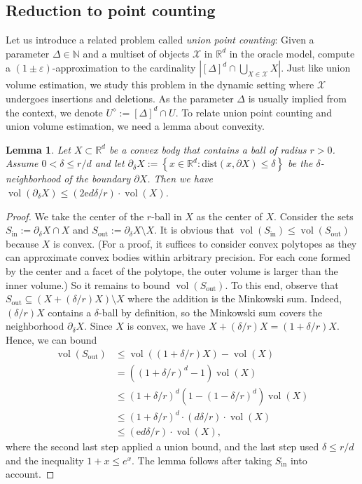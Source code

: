 \documentclass[11pt]{article}
\def\Real{\mathbb{R}}
\def\Natural{\mathbb{N}}
\let\N\Natural
\let\R\Real
\def\vol{\operatorname{vol}}		%
\def\set#1{\left\{ #1 \right\}}
\def\card#1{\left\lvert #1 \right\rvert}		%
\newtheorem{lemma}[theorem]{Lemma}
\newcommand{\eps}{\varepsilon}
\newcommand{\class}[1]{\mathcal{#1}}
\newcommand{\discrete}[1]{#1^\diamond}
\begin{document}
\subsection{Reduction to point counting}
Let us introduce a related problem called \emph{union point counting}: Given a parameter $\Delta \in \N$ and a multiset of objects $\class{X}$ in $\R^d$ in the oracle model, compute a $(1 \pm \eps)$-approximation to the cardinality $\card{[\Delta]^d \cap \bigcup_{X \in \class{X}} X}$. Just like union volume estimation, we study this problem in the dynamic setting where $\class{X}$ undergoes insertions and deletions.
%
As the parameter $\Delta$ is usually implied from the context, we denote $\discrete{U} := [\Delta]^d \cap U$. To relate union point counting and union volume estimation, we need a lemma about convexity.
%
\begin{lemma}
    \label{lem:grid}
    Let $X \subset \R^d$ be a convex body that contains a ball of radius $r > 0$. Assume $0 < \delta \leq r/d$ and let $\partial_\delta X := \set{x \in \R^d : \mathrm{dist}(x,\partial X) \leq \delta}$ be the $\delta$-neighborhood of the boundary $\partial X$. Then we have $\vol(\partial_\delta X) \leq (2 \mathrm{e} d \delta / r) \cdot \vol(X)$.
\end{lemma}
%
\begin{proof}
    We take the center of the $r$-ball in $X$ as the center of $X$. Consider the sets $S_\text{in} := \partial_\delta X \cap X$ and $S_\text{out} := \partial_\delta X \setminus X$. It is obvious that $\vol(S_\text{in}) \leq \vol(S_\text{out})$ because $X$ is convex. (For a proof, it suffices to consider convex polytopes as they can approximate convex bodies within arbitrary precision. For each cone formed by the center and a facet of the polytope, the outer volume is larger than the inner volume.) So it remains to bound $\vol(S_\text{out})$.
%
    To this end, observe that $S_\text{out} \subseteq (X + (\delta/r) X) \setminus X$ where the addition is the Minkowski sum. Indeed, $(\delta/r) X$ contains a $\delta$-ball by definition, so the Minkowski sum covers the neighborhood $\partial_\delta X$.
%
    Since $X$ is convex, we have $X + (\delta/r) X = (1+\delta/r) X$. Hence, we can bound
    \begin{align*}
        \vol(S_\text{out})
        &\leq \vol((1+\delta/r)X) - \vol(X) \\
        &= ((1+\delta/r)^d - 1) \vol(X) \\
        &\leq (1+\delta/r)^d \left( 1 - (1 - \delta/r)^d \right) \vol(X) \\
        &\leq (1+\delta/r)^d \cdot (d \delta / r) \cdot \vol(X) \\
        &\leq (\mathrm{e} d \delta/r) \cdot \vol(X),
    \end{align*}
    where the second last step applied a union bound, and the last step used $\delta \leq r/d$ and the inequality $1+x \leq e^x$. The lemma follows after taking $S_\text{in}$ into account.
\end{proof}
\end{document}
